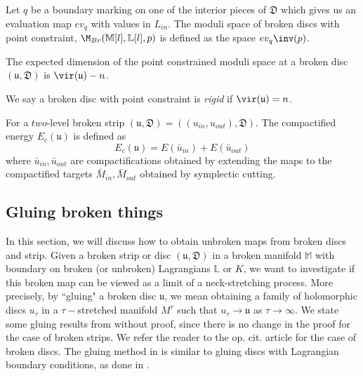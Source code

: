 \begin{defn}
Let $q$ be a boundary marking on one of the interior pieces of  $\mathfrak{D}$ which gives us an evaluation map $ev_q$ with values in $L_{in}$. The moduli space of broken discs with point constraint, $\M_{Br}(\mathbb M [l],\mathbb L [l],p)$ is defined as the space $ev_{q}\inv (p)$.

\end{defn}


\noindent The expected dimension of the point constrained moduli space at a broken disc $(\mathfrak{u,D})$ is $\vir(\mathfrak{u}) - n$.

 \begin{defn}
  
 We say a broken disc with point constraint is \textit{rigid} if $\vir(\mathfrak{u}) = n$.

 \end{defn}


\begin{defn}
For a $two$-level broken strip $(\mathfrak{u,D})= ((u_{in},u_{out}), \mathfrak D)$. The compactified energy $E_c(\mathfrak{u})$ is defined as 
$$E_c(\mathfrak u) = E(\bar u_{in}) + E(\bar u_{out})$$
where $\bar{u} _{in} , \bar u_{out}$ are compactifications obtained by extending the maps to the compactified targets $\bar M_{in}, \bar M _{out}$ obtained by symplectic cutting.
\end{defn}





\subsection{Gluing broken things }

In this section, we will discuss how to obtain unbroken maps from broken discs and strip. Given a broken strip or disc $(\mathfrak{u,D})$ in a broken manifold $\mathbb{M}$ with boundary on broken (or unbroken) Lagrangians $\mathbb L$ or $K$, we want to investigate if this broken map can be viewed as a limit of a neck-stretching process. More precisely, by ``gluing" a broken disc $\mathfrak{u}$,  we mean obtaining a family of holomorphic discs $u_\tau$ in a $\tau-$stretched manifold $M^\tau$ such that $u_\tau \to \mathfrak{u}$ as $\tau \to \infty$.  We state some gluing results from \cite{palmerwoodwardsurg} without proof, since there is no change in the proof for the case of broken strips. We refer the reader to the op. cit. article for the case of broken discs. The gluing method in \cite{palmerwoodwardsurg} is similar to gluing discs with Lagrangian boundary conditions, as done in \cite{abouzaidExotic}.

